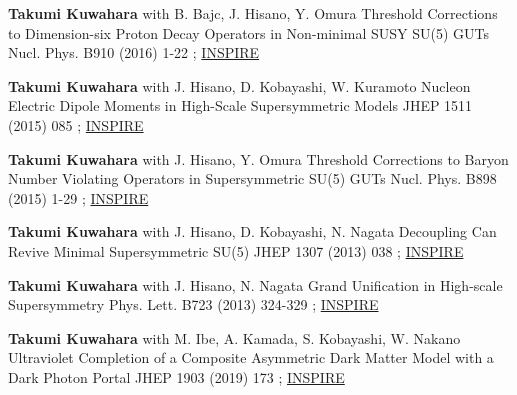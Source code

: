 \begin{publist}
\pubentry
  {\textbf{Takumi Kuwahara} with B. Bajc, J. Hisano, Y. Omura}
  {Threshold Corrections to Dimension-six Proton Decay Operators in Non-minimal SUSY SU(5) GUTs}
  {Nucl. Phys. B910 (2016) 1-22}
  {; \href{https://inspirehep.net/literature/1427298}{INSPIRE}}

\pubentry
  {\textbf{Takumi Kuwahara} with J. Hisano, D. Kobayashi, W. Kuramoto}
  {Nucleon Electric Dipole Moments in High-Scale Supersymmetric Models}
  {JHEP 1511 (2015) 085}
  {; \href{https://inspirehep.net/literature/1384127}{INSPIRE}}

\pubentry
  {\textbf{Takumi Kuwahara} with J. Hisano, Y. Omura}
  {Threshold Corrections to Baryon Number Violating Operators in Supersymmetric SU(5) GUTs}
  {Nucl. Phys. B898 (2015) 1-29}
  {; \href{https://inspirehep.net/literature/1357018}{INSPIRE}}

\pubentry
  {\textbf{Takumi Kuwahara} with J. Hisano, D. Kobayashi, N. Nagata}
  {Decoupling Can Revive Minimal Supersymmetric SU(5)}
  {JHEP 1307 (2013) 038}
  {; \href{https://inspirehep.net/literature/1228218}{INSPIRE}}

\pubentry
  {\textbf{Takumi Kuwahara} with J. Hisano, N. Nagata}
  {Grand Unification in High-scale Supersymmetry}
  {Phys. Lett. B723 (2013) 324-329}
  {; \href{https://inspirehep.net/literature/1226006}{INSPIRE}}

\pubentry
  {\textbf{Takumi Kuwahara} with M. Ibe, A. Kamada, S. Kobayashi, W. Nakano}
  {Ultraviolet Completion of a Composite Asymmetric Dark Matter Model with a Dark Photon Portal}
  {JHEP 1903 (2019) 173}
  {; \href{https://inspirehep.net/literature/1705053}{INSPIRE}}

\end{publist}
